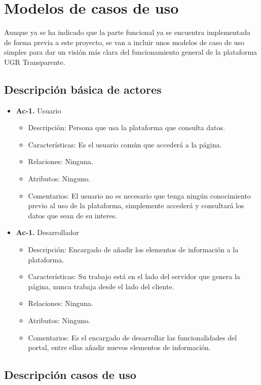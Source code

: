 \section{Modelos de casos de uso}

Aunque ya se ha indicado que la parte funcional ya se encuentra implementada de forma previa a este proyecto, se van a incluir
unos modelos de caso de uso simples para dar un visión más clara del funcionamiento general de la plataforma UGR Transparente.

\newpage
\subsection{Descripción básica de actores}

\begin{itemize}
  \item \textbf{Ac-1.} Usuario
  \begin{itemize}
   \item Descripción: Persona que usa la plataforma que consulta datos.
   \item Características: Es el usuario común que accederá a la página.
   \item Relaciones: Ninguna.
   \item Atributos: Ninguno.
   \item Comentarios: El usuario no es necesario que tenga ningún conocimiento previo al uso de la plataforma, simplemente
   accederá y consultará los datos que sean de su interes.
  \end{itemize}
  
  \item \textbf{Ac-1.} Desarrollador
  \begin{itemize}
   \item Descripción: Encargado de añadir los elementos de información a la plataforma.
   \item Características: Su trabajo está en el lado del servidor que genera la página, nunca trabaja desde el lado del cliente.
   \item Relaciones: Ninguna.
   \item Atributos: Ninguno.
   \item Comentarios: Es el encargado de desarrollar las funcionalidades del portal, entre ellas añadir nuevos elementos de
   información.
  \end{itemize}
\end{itemize}

\subsection{Descripción casos de uso}

